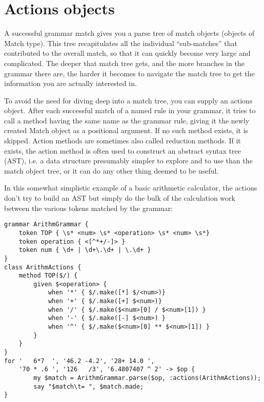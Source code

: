 \section{Actions objects}

\label{actions_object}

A successful grammar match gives you a parse tree of 
match objects (objects of Match type). This tree 
recapitulates all the individual 
``sub-matches'' that contributed to the overall match, so 
that it can quickly become very large and complicated. 
The deeper that match tree gets, and the more branches in 
the grammar there are, the harder it becomes to navigate the 
match tree to get the information you are actually 
interested in.

To avoid the need for diving deep into a match tree, you 
can supply an actions object. After each successful match 
of a named rule in your grammar, it tries to call a method 
having the same name as the grammar rule, giving it the 
newly created Match object as a positional argument. 
If no such method exists, it is skipped. Action methods 
are sometimes also called reduction methods. If it exists, 
the action method is often used to construct an abstract 
syntax tree (AST), i.e. a data structure presumably 
simpler to explore and to use than the match object tree, 
or it can do any other thing deemed to be useful.

In this somewhat simplistic example of a basic arithmetic  
calculator, the actions don't try to build an AST but simply 
do the bulk of the calculation work between the various tokens
matched by the grammar:

\begin{verbatim}
grammar ArithmGrammar {
    token TOP { \s* <num> \s* <operation> \s* <num> \s*}
    token operation { <[^*+/-]> }
    token num { \d+ | \d+\.\d+ | \.\d+ }
}
class ArithmActions {
    method TOP($/) {
        given $<operation> {
            when '*' { $/.make([*] $/<num>)}
            when '+' { $/.make([+] $<num>)}
            when '/' { $/.make($<num>[0] / $<num>[1]) }
            when '-' { $/.make([-] $<num>) }
            when '^' { $/.make($<num>[0] ** $<num>[1]) }
        }
    }
}
for '   6*7  ', '46.2 -4.2', '28+ 14.0 ',
    '70 * .6 ', '126   /3', '6.4807407 ^ 2' -> $op {
        my $match = ArithmGrammar.parse($op, :actions(ArithmActions));
        say "$match\t= ", $match.made;
}
\end{verbatim}

